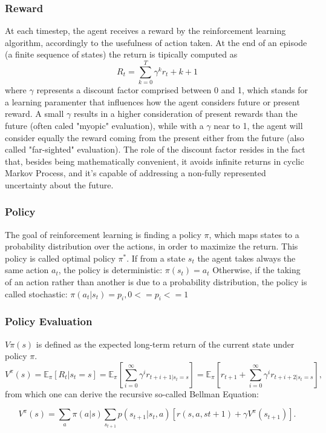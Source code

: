 \subsubsection{Reward}
At each timestep, the agent receives a reward by the reinforcement learning algorithm, accordingly to the usefulness of action taken.
At the end of an episode (a finite sequence of states) the return is tipically computed as \[R_t = \sum^{T}_{k=0}\gamma^k r_t + k +1\] where \(\gamma\) represents a discount factor comprised between 0 and 1, which stands for a learning paramenter that influences how the agent considers future                              or present reward. A small \(\gamma\) results in a higher consideration of present rewards than the future (often caled "myopic" evaluation), while with a \(\gamma\) near to 1, the agent will consider equally the reward coming from the present either from the future (also called "far-sighted" evaluation). The role of the discount factor resides in the fact that, besides being mathematically convenient, it avoids infinite returns in cyclic Markov Process, and it's capable of addressing a non-fully represented uncertainty about the future.

\subsubsection{Policy}
The goal of reinforcement learning is finding a policy \(\pi\), which maps states to a probability distribution over the actions, in order to maximize the return. This policy is called optimal policy \(\pi^*\).
If from a state \(s_t\) the agent takes always the same action \(a_t\), the policy is deterministic:
\(\pi(s_t) = a_t\)
Otherwise, if the taking of an action rather than another is due to a probability distribution, the policy is called stochastic:
\(\pi(a_t|s_t) = p_i, 0<=p_i<=1\)


\subsubsection{Policy Evaluation}
$V\pi(s)$ is defined as the expected long-term return of the current state under policy $\pi$. 
\[V^\pi(s) = \mathbb{E}_\pi{\left[R_t|s_t=s\right]}= \mathbb{E}_\pi\left[\sum^{\infty}_{i=0}\gamma^ir_{t+i+1|s_t=s}\right] = \mathbb{E}_\pi\left[r_{t+1} + \sum^{\infty}_{i=0}\gamma^ir_{t+i+2|s_t=s}\right],\]
from which one can derive the recursive so-called Bellman Equation:

\[V^\pi(s) = \sum_a\pi(a|s)\sum_{s_{t+1}}p(s_{t+1}|s_t,a)[r(s,a,s{t+1})+\gamma V^\pi(s_{t+1})].\]

